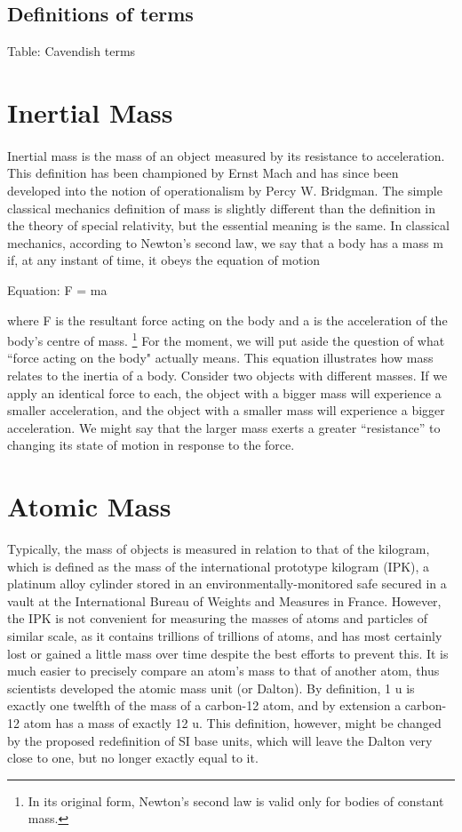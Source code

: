 \documentclass{book}
\begin{document}
    \subsection{Definitions of terms}
    Table: Cavendish terms
    
    \section{Inertial Mass}
    \paragraph{}
    Inertial mass is the mass of an object measured by its resistance to acceleration. This definition has been championed by Ernst Mach and has since been developed into the notion of operationalism by Percy W. Bridgman. The simple classical mechanics definition of mass is slightly different than the definition in the theory of special relativity, but the essential meaning is the same. In classical mechanics, according to Newton's second law, we say that a body has a mass m if, at any instant of time, it obeys the equation of motion
    
    Equation: F = ma
    
    where F is the resultant force acting on the body and a is the acceleration of the body's centre of mass. \footnote{ In its original form, Newton's second law is valid only for bodies of constant mass.} For the moment, we will put aside the question of what ``force acting on the body" actually means. This equation illustrates how mass relates to the inertia of a body. Consider two objects with different masses. If we apply an identical force to each, the object with a bigger mass will experience a smaller acceleration, and the object with a smaller mass will experience a bigger acceleration. We might say that the larger mass exerts a greater ``resistance'' to changing its state of motion in response to the force.
    
    \section{Atomic Mass}
    Typically, the mass of objects is measured in relation to that of the kilogram, which is defined as the mass of the international prototype kilogram (IPK), a platinum alloy cylinder stored in an environmentally-monitored safe secured in a vault at the International Bureau of Weights and Measures in France. However, the IPK is not convenient for measuring the masses of atoms and particles of similar scale, as it contains trillions of trillions of atoms, and has most certainly lost or gained a little mass over time despite the best efforts to prevent this. It is much easier to precisely compare an atom's mass to that of another atom, thus scientists developed the atomic mass unit (or Dalton). By definition, 1 u is exactly one twelfth of the mass of a carbon-12 atom, and by extension a carbon-12 atom has a mass of exactly 12 u. This definition, however, might be changed by the proposed redefinition of SI base units, which will leave the Dalton very close to one, but no longer exactly equal to it.
    
\end{document}

